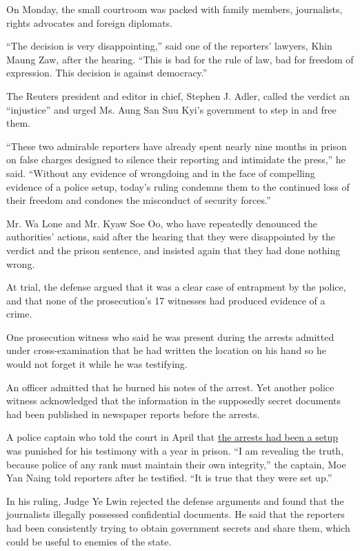 On Monday, the small courtroom was packed with family members,
journalists, rights advocates and foreign diplomats.

``The decision is very disappointing,'' said one of the reporters'
lawyers, Khin Maung Zaw, after the hearing. ``This is bad for the rule
of law, bad for freedom of expression. This decision is against
democracy.''

The Reuters president and editor in chief, Stephen J. Adler, called the
verdict an ``injustice'' and urged Ms. Aung San Suu Kyi's government to
step in and free them.

``These two admirable reporters have already spent nearly nine months in
prison on false charges designed to silence their reporting and
intimidate the press,'' he said. ``Without any evidence of wrongdoing
and in the face of compelling evidence of a police setup, today's ruling
condemns them to the continued loss of their freedom and condones the
misconduct of security forces.''

Mr. Wa Lone and Mr. Kyaw Soe Oo, who have repeatedly denounced the
authorities' actions, said after the hearing that they were disappointed
by the verdict and the prison sentence, and insisted again that they had
done nothing wrong.

At trial, the defense argued that it was a clear case of entrapment by
the police, and that none of the prosecution's 17 witnesses had produced
evidence of a crime.

One prosecution witness who said he was present during the arrests
admitted under cross-examination that he had written the location on his
hand so he would not forget it while he was testifying.

An officer admitted that he burned his notes of the arrest. Yet another
police witness acknowledged that the information in the supposedly
secret documents had been published in newspaper reports before the
arrests.

A police captain who told the court in April that
\href{https://www.nytimes3xbfgragh.onion/2018/05/02/world/asia/myanmar-journalists-police-captain.html}{the
arrests had been a setup} was punished for his testimony with a year in
prison. ``I am revealing the truth, because police of any rank must
maintain their own integrity,'' the captain, Moe Yan Naing told
reporters after he testified. ``It is true that they were set up.''

In his ruling, Judge Ye Lwin rejected the defense arguments and found
that the journalists illegally possessed confidential documents. He said
that the reporters had been consistently trying to obtain government
secrets and share them, which could be useful to enemies of the state.

